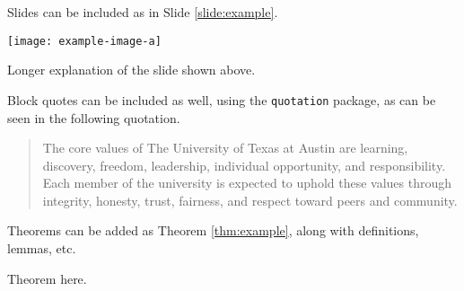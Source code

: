 Slides can be included as in Slide \ref{slide:example}.
\begin{slide}[H]
    \centering
    \texttt{[image: example-image-a]}
    \caption[Short example slide title]{Longer explanation of the slide shown above.}
    \label{slide:example}
\end{slide}

Block quotes can be included as well, using the \verb|quotation| package, as can be seen in the following quotation.
\begin{quotation}
The core values of The University of Texas at Austin are learning, discovery, freedom, leadership, individual opportunity, and responsibility. Each member of the university is expected to uphold these values through integrity, honesty, trust, fairness, and respect toward peers and community.
\end{quotation}

Theorems can be added as Theorem \ref{thm:example}, along with definitions, lemmas, etc.
\begin{thm}
\label{thm:example}
Theorem here.
\end{thm}